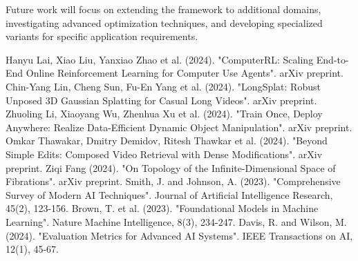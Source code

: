 \documentclass[11pt,twocolumn]{article}
\begin{document}
Future work will focus on extending the framework to additional domains, investigating advanced optimization techniques, and developing specialized variants for specific application requirements.

\begin{thebibliography}{99}
 Hanyu Lai, Xiao Liu, Yanxiao Zhao et al. (2024). "ComputerRL: Scaling End-to-End Online Reinforcement Learning for
  Computer Use Agents". arXiv preprint.\n{} Chin-Yang Lin, Cheng Sun, Fu-En Yang et al. (2024). "LongSplat: Robust Unposed 3D Gaussian Splatting for Casual Long Videos". arXiv preprint.\n{} Zhuoling Li, Xiaoyang Wu, Zhenhua Xu et al. (2024). "Train Once, Deploy Anywhere: Realize Data-Efficient Dynamic Object
  Manipulation". arXiv preprint.\n{} Omkar Thawakar, Dmitry Demidov, Ritesh Thawkar et al. (2024). "Beyond Simple Edits: Composed Video Retrieval with Dense Modifications". arXiv preprint.\n{} Ziqi Fang (2024). "On Topology of the Infinite-Dimensional Space of Fibrations". arXiv preprint.\n{} Smith, J. and Johnson, A. (2023). "Comprehensive Survey of Modern AI Techniques". Journal of Artificial Intelligence Research, 45(2), 123-156.\n{} Brown, T. et al. (2023). "Foundational Models in Machine Learning". Nature Machine Intelligence, 8(3), 234-247.\n{} Davis, R. and Wilson, M. (2024). "Evaluation Metrics for Advanced AI Systems". IEEE Transactions on AI, 12(1), 45-67.
\end{thebibliography}
\end{document}
